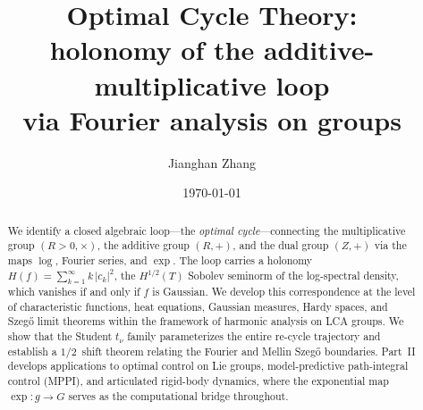 \documentclass[12pt]{amsart}
\title[Optimal Cycle Theory]{Optimal Cycle Theory:\\ holonomy of the additive-multiplicative loop\\ via Fourier analysis on groups}
\author{Jianghan Zhang}
\date{\today}
\def\tfrac#1#2{#1/#2}%
\let\Rpos\relax \def\Rpos{R>0}%
\let\R\relax \def\R{R}%
\let\Z\relax \def\Z{Z}%
\let\bT\relax \def\bT{T}%
\let\mathfrak\relax \def\mathfrak#1{#1}%
\theoremstyle{definition}
\theoremstyle{remark}
\newcommand{\R}{\mathbb{R}}
\newcommand{\Rpos}{\mathbb{R}_{>0}}
\newcommand{\bT}{\mathbb{T}}
\newcommand{\Z}{\mathbb{Z}}
\begin{document}
\begin{abstract}
We identify a closed algebraic loop---the \emph{optimal cycle}---connecting the multiplicative group $(\Rpos, \times)$, the additive group $(\R, +)$, and the dual group $(\Z, +)$ via the maps $\log$, Fourier series, and $\exp$. The loop carries a holonomy $H(f) = \sum_{k=1}^{\infty} k\,|c_k|^2$, the $H^{1/2}(\bT)$ Sobolev seminorm of the log-spectral density, which vanishes if and only if $f$ is Gaussian. We develop this correspondence at the level of characteristic functions, heat equations, Gaussian measures, Hardy spaces, and Szeg\H{o} limit theorems within the framework of harmonic analysis on LCA groups. We show that the Student $t_\nu$ family parameterizes the entire re-cycle trajectory and establish a $\tfrac{1}{2}$~shift theorem relating the Fourier and Mellin Szeg\H{o} boundaries. Part~II develops applications to optimal control on Lie groups, model-predictive path-integral control (MPPI), and articulated rigid-body dynamics, where the exponential map $\exp : \mathfrak{g} \to G$ serves as the computational bridge throughout.
\end{abstract}

\maketitle




























\end{document}
